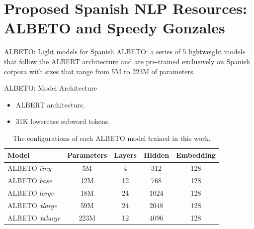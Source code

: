 \documentclass[aspectratio=169,xcolor=dvipsnames]{beamer}
\begin{document}
\section{Proposed Spanish NLP Resources: ALBETO and Speedy Gonzales}
\begin{frame}{ALBETO: Light models for Spanish}
\centering
\large{ALBETO: a series of 5 lightweight models that follow the ALBERT architecture and are pre-trained exclusively on Spanish corpora with sizes that range from 5M to 223M of parameters.}
\end{frame}
\begin{frame}{ALBETO: Model Architecture}

\begin{itemize}
    \item ALBERT architecture.
    \item 31K lowercase subword tokens.
\end{itemize}

\begin{table}[]
\begin{center}
\begin{tabular}{lcccc}
\hline
\textbf{Model}          & \textbf{Parameters} & \textbf{Layers} & \textbf{Hidden} & \textbf{Embedding} \\ \hline
ALBETO \textit{tiny}    & 5M         & 4      & 312    & 128       \\ 
ALBETO \textit{base}    & 12M        & 12     & 768    & 128       \\ 
ALBETO \textit{large}   & 18M        & 24     & 1024   & 128       \\ 
ALBETO \textit{xlarge}  & 59M        & 24     & 2048   & 128       \\ 
ALBETO \textit{xxlarge} & 223M       & 12     & 4096   & 128       \\ \hline
\end{tabular}
\end{center}
\caption{The configurations of each ALBETO model trained in this work.}
\label{table:albeto-configurations}
\end{table}

\end{frame}
\end{document}
